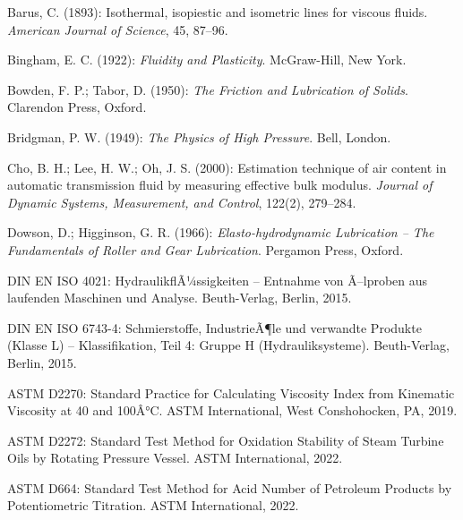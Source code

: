 ﻿\documentclass[a4paper,12pt]{scrreprt}
\theoremstyle{definition}
\begin{document}
\begin{enumerate}[label={[\arabic*]}]

  \item Barus, C. (1893): Isothermal, isopiestic and isometric lines for
    viscous fluids. \textit{American Journal of Science}, 45, 87--96.

  \item Bingham, E. C. (1922): \textit{Fluidity and Plasticity}.
    McGraw-Hill, New York.

  \item Bowden, F. P.; Tabor, D. (1950): \textit{The Friction and
    Lubrication of Solids}. Clarendon Press, Oxford.

  \item Bridgman, P. W. (1949): \textit{The Physics of High Pressure}.
    Bell, London.

  \item Cho, B. H.; Lee, H. W.; Oh, J. S. (2000): Estimation
    technique of air content in automatic transmission fluid by
    measuring effective bulk modulus. \textit{Journal of Dynamic
    Systems, Measurement, and Control}, 122(2), 279--284.

  \item Dowson, D.; Higginson, G. R. (1966): \textit{Elasto-hydrodynamic
    Lubrication -- The Fundamentals of Roller and Gear Lubrication}.
    Pergamon Press, Oxford.

  \item DIN EN ISO 4021: HydraulikflÃ¼ssigkeiten -- Entnahme von
    Ã–lproben aus laufenden Maschinen und Analyse.
    Beuth-Verlag, Berlin, 2015.

  \item DIN EN ISO 6743-4: Schmierstoffe, IndustrieÃ¶le und
    verwandte Produkte (Klasse L) -- Klassifikation, Teil 4:
    Gruppe H (Hydrauliksysteme). Beuth-Verlag, Berlin, 2015.

  \item ASTM D2270: Standard Practice for Calculating Viscosity
    Index from Kinematic Viscosity at 40 and 100Â°C.
    ASTM International, West Conshohocken, PA, 2019.

  \item ASTM D2272: Standard Test Method for Oxidation Stability
    of Steam Turbine Oils by Rotating Pressure Vessel.
    ASTM International, 2022.

  \item ASTM D664: Standard Test Method for Acid Number of Petroleum
    Products by Potentiometric Titration.
    ASTM International, 2022.


\end{enumerate}
\end{document}
